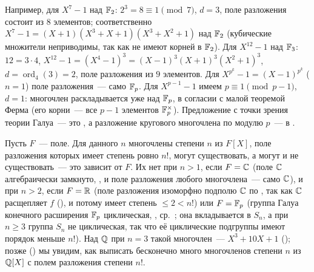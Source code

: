 Например, для $X^7-1$ над $\mathbb F_2$: $2^3=8\equiv1\pmod 7$, $d=3$, поле разложения состоит из $8$ элементов; соответственно
$X^7-1=(X+1)(X^3+X+1)(X^3+X^2+1)$ над $\mathbb F_2$ (кубические множители неприводимы, так как не имеют корней в $\mathbb F_2$). Для
$X^{12}-1$ над $\mathbb F_3$: $12=3\cdot4$, $X^{12}-1=(X^4-1)^3=(X-1)^3(X+1)^3(X^2+1)^3$, $d=\operatorname{ord}_4(3)=2$, поле
разложения из $9$ элементов. Для $X^{p^k}-1=(X-1)^{p^k}$ ($n=1$) поле разложения~--- само $\mathbb F_p$. Для $X^{p-1}-1$ имеем
$p\equiv1\pmod{p-1}$, $d=1$: многочлен раскладывается уже над $\mathbb F_p$, в согласии с малой теоремой Ферма (его корни~---
все $p-1$ элементов $\mathbb F_p^\times$). Предложение  с точки зрения теории Галуа~--- это , а разложение кругового многочлена по модулю $p$~--- в .

\begin{aside}[2.11]
Пусть $F$~--- поле. Для данного $n$ многочлены степени $n$ из $F[X]$, поле разложения которых имеет степень ровно $n!$,
могут существовать, а могут и не существовать~--- это зависит от $F$. Их нет при $n>1$, если $F=\mathbb C$ (поле $\mathbb C$
алгебраически замкнуто, , и поле разложения любого многочлена~--- само $\mathbb C$), и при $n>2$, если $F=\mathbb R$ (поле
разложения изоморфно подполю $\mathbb C$ по , так как $\mathbb C$ расщепляет $f$ (), и потому имеет степень
$\le2<n!$) или $F=\mathbb F_p$ (группа Галуа конечного расширения $\mathbb F_p$
циклическая, , ср.\ ; она вкладывается в $S_n$, а при $n\ge3$ группа $S_n$ не циклическая, так что
её циклические подгруппы имеют порядок меньше $n!$). Над $\mathbb Q$ при $n=3$ такой
многочлен~--- $X^3+10X+1$ (); позже () мы увидим, как выписать бесконечно много многочленов степени $n$
из $\mathbb Q[X]$ с полем разложения степени $n!$.
\end{aside}
